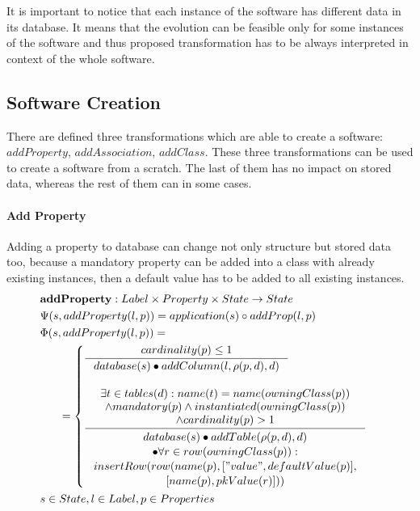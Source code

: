 \documentclass[11pt]{article}
\begin{document}
It is important to notice that each instance of the software has different data in its database. It means that the evolution can be feasible only for some instances of the software and thus proposed transformation has to be always interpreted in context of the whole software.


\subsection{Software Creation}
There are defined three transformations which are able to create a software: $addProperty$, $addAssociation$,  $addClass$. These three transformations can be used to create a software from a scratch. The last of them has no impact on stored data, whereas the rest of them can in some cases.
\paragraph{Add Property} Adding a property to database can change not only structure but stored data too, because a mandatory property can be added into a class with already existing instances, then a default value has to be added to all existing instances.
\begin{align*}
&	\mathbf{addProperty} : Label \times Property \times State \rightarrow State \\
&	\Psi(s, addProperty(l, p)) = application(s) \circ addProp(l,p) \\
&	\Phi(s, addProperty(l, p)) = \\
& \;\;\;\;\;\; = \begin{cases}
    		\inference{cardinality(p) \leq 1}{database(s) \bullet addColumn(l, \rho(p,d), d)} \\ \\
	    \inference{ \exists t \in tables(d) : name(t) = name(owningClass(p)) \\ \wedge mandatory(p) \wedge instantiated(owningClass(p)) \\ \wedge cardinality(p) > 1}{\begin{gathered}
   database(s) \bullet addTable(\rho(p,d), d) \\ \bullet \forall r \in row(owningClass(p)) :\\ insertRow(row(name(p), ["value", defaultValue(p)], \\ [name(p), pkValue(r)])) 
    \end{gathered} } 
   \end{cases}\\
&	s \in State, l \in Label, p \in Properties
\end{align*}
\end{document}
